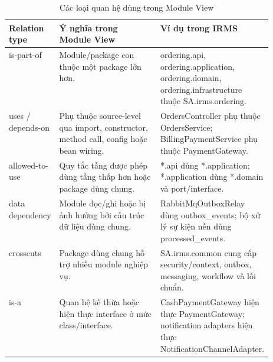\begin{table}[H]
\centering
\scriptsize
\renewcommand{\arraystretch}{1.15}
\setlength{\tabcolsep}{2pt}
\caption{Các loại quan hệ dùng trong Module View}
\label{tab:irms-module-relation-types}
\begin{tabularx}{\textwidth}{>{\raggedright\arraybackslash}p{0.18\linewidth} >{\raggedright\arraybackslash}X >{\raggedright\arraybackslash}p{0.34\linewidth}}
\toprule
\textbf{Relation type} & \textbf{Ý nghĩa trong Module View} & \textbf{Ví dụ trong IRMS} \\
\midrule
\textsf{is-part-of} & Module/package con thuộc một package lớn hơn. & \textsf{ordering.api}, \textsf{ordering.application}, \textsf{ordering.domain}, \textsf{ordering.infrastructure} thuộc \textsf{SA.irms.ordering}. \\
\textsf{uses / depends-on} & Phụ thuộc source-level qua import, constructor, method call, config hoặc bean wiring. & \textsf{OrdersController} phụ thuộc \textsf{OrdersService}; \textsf{BillingPaymentService} phụ thuộc \textsf{PaymentGateway}. \\
\textsf{allowed-to-use} & Quy tắc tầng được phép dùng tầng thấp hơn hoặc package dùng chung. & \textsf{*.api} dùng \textsf{*.application}; \textsf{*.application} dùng \textsf{*.domain} và port/interface. \\
\textsf{data dependency} & Module đọc/ghi hoặc bị ảnh hưởng bởi cấu trúc dữ liệu dùng chung. & \textsf{RabbitMqOutboxRelay} dùng \textsf{outbox\_events}; bộ xử lý sự kiện nền dùng \textsf{processed\_events}. \\
\textsf{crosscuts} & Package dùng chung hỗ trợ nhiều module nghiệp vụ. & \textsf{SA.irms.common} cung cấp security/context, outbox, messaging, workflow và lỗi chuẩn. \\
\textsf{is-a} & Quan hệ kế thừa hoặc hiện thực interface ở mức class/interface. & \textsf{CashPaymentGateway} hiện thực \textsf{PaymentGateway}; notification adapters hiện thực \textsf{NotificationChannelAdapter}. \\
\bottomrule
\end{tabularx}
\end{table}


